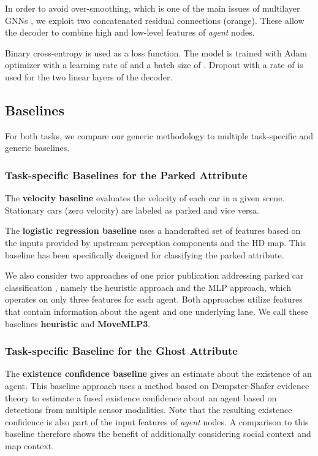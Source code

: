 \documentclass[letterpaper, 10 pt, journal, twoside]{IEEEtran}
\begin{document}
In order to avoid over-smoothing, which is one of the main issues of multilayer GNNs \cite{Zhou2020}, we exploit two concatenated residual connections (orange).
These allow the decoder to combine high and low-level features of \textit{agent} nodes.

Binary cross-entropy is used as a loss function.
The model is trained with Adam optimizer \cite{Kingma2015} with a learning rate of  and a batch size of .
Dropout with a rate of  is used for the two linear layers of the decoder.

\subsection{Baselines}
For both tasks, we compare our generic methodology to multiple task-specific and generic baselines.

\subsubsection{Task-specific Baselines for the Parked Attribute}
The \textbf{velocity baseline} evaluates the velocity of each car in a given scene.
Stationary cars (zero velocity) are labeled as parked and vice versa.

The \textbf{logistic regression baseline} uses a handcrafted set of features based on the inputs provided by upstream perception components and the HD map.
This baseline has been specifically designed for classifying the parked attribute.

We also consider two approaches of one prior publication addressing parked car classification \cite{Behrendt2019}, namely the heuristic approach and the MLP approach, which operates on only three features for each agent.
Both approaches utilize features that contain information about the agent and one underlying lane.
We call these baselines \textbf{heuristic} and \textbf{MoveMLP3}.

\subsubsection{Task-specific Baseline for the Ghost Attribute}
The \textbf{existence confidence baseline} gives an estimate about the existence of an agent.
This baseline approach \cite{Aeberhard2011} uses a method based on Dempster-Shafer evidence theory to estimate a fused existence confidence about an agent based on detections from multiple sensor modalities.
Note that the resulting existence confidence is also part of the input features of \textit{agent} nodes.
A comparison to this baseline therefore shows the benefit of additionally considering social context and map context.
\end{document}
